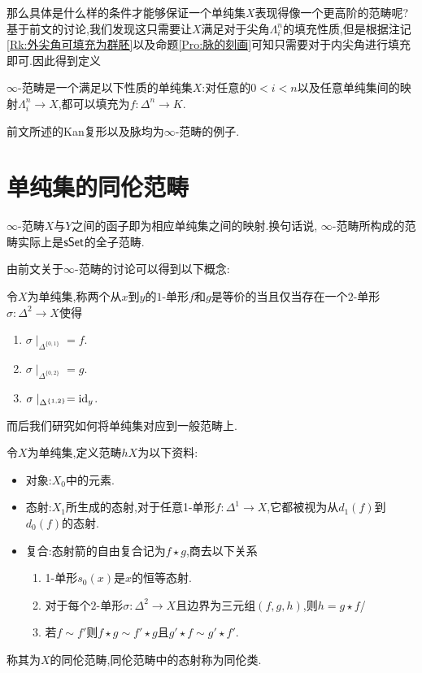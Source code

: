 那么具体是什么样的条件才能够保证一个单纯集$X$表现得像一个更高阶的范畴呢?基于前文的讨论,我们发现这只需要让$X$满足对于尖角$\Lambda_i^n$的填充性质,但是根据注记\ref{Rk:外尖角可填充为群胚}以及命题\ref{Pro:脉的刻画}可知只需要对于内尖角进行填充即可.因此得到定义
\begin{definition}
    $\infty$-范畴是一个满足以下性质的单纯集$X$:对任意的$0<i<n$以及任意单纯集间的映射$\Lambda_i^n \to X$,都可以填充为$f: \Delta^n \to K$.
\end{definition}
\begin{example}
    前文所述的Kan复形以及脉均为$\infty$-范畴的例子.
\end{example}
\section{单纯集的同伦范畴}
\begin{definition}
    $\infty$-范畴$X$与$Y$之间的函子即为相应单纯集之间的映射.换句话说, $\infty$-范畴所构成的范畴实际上是$\mathsf{sSet}$的全子范畴.
\end{definition}
由前文关于$\infty$-范畴的讨论可以得到以下概念:
\begin{definition}[$1$-单形等价]\label{定义:1-单形等价}
    令$X$为单纯集,称两个从$x$到$y$的$1$-单形$f$和$g$是等价的当且仅当存在一个$2$-单形$\sigma : \Delta^2 \to X$使得
    \begin{enumerate}
        \item $\sigma\mid_{\Delta^{\{0,1\}}} = f$.
        \item $\sigma\mid_{\Delta^{\{0,2\}}} = g$.
        \item $\sigma\mid_{\Delta^{\{1,2\}}} = \mathrm{id}_y$.
    \end{enumerate}
\end{definition}
而后我们研究如何将单纯集对应到一般范畴上.
\begin{definition}[同伦范畴]
    令$X$为单纯集,定义范畴$hX$为以下资料:
    \begin{itemize}
        \item 对象:$X_0$中的元素.
        \item 态射:$X_1$所生成的态射,对于任意1-单形$f:\Delta^1 \to X$,它都被视为从$d_1(f)$到$d_0(f)$的态射.
        \item 复合:态射箭的自由复合记为$f\star g$,商去以下关系
        \begin{enumerate}
            \item 1-单形$s_0(x)$是$x$的恒等态射.
            \item 对于每个$2$-单形$\sigma:\Delta^2 \to X$且边界为三元组$(f,g,h)$,则$h= g\star f$/
            \item 若$f\sim f'$则$f\star g\sim f'\star g$且$g'\star f\sim g'\star f'$.
        \end{enumerate}
    \end{itemize}
    称其为$X$的同伦范畴,同伦范畴中的态射称为同伦类.
\end{definition}

